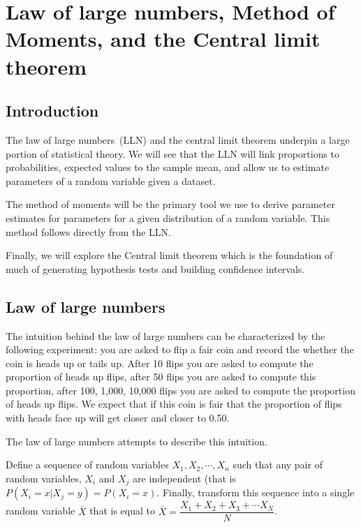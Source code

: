 \chapter{Law of large numbers, Method of Moments, and the Central limit theorem}
\hspace{1mm}

\section{Introduction}\label{intro}

The law of large numbers~(LLN) and the central limit theorem underpin a large portion of statistical theory. 
We will see that the LLN will link proportions to probabilities, expected values to the sample mean, and allow us to estimate parameters of a random variable given a dataset.

The method of moments will be the primary tool we use to derive parameter estimates for parameters for a given distribution of a random variable. This method follows directly from the LLN.

Finally, we will explore the Central limit theorem which is the foundation of much of  generating hypothesis tests and building confidence intervals. 

\section{Law of large numbers}\label{intro}

The intuition behind the law of large numbers can be characterized by the following experiment: you are asked to flip a fair coin and record the whether the coin is heads up or tails up. After 10 flips you are asked to compute the proportion of heads up flips, after 50 flips you are asked to compute this proportion, after 100, 1,000, 10,000 flips you are asked to compute the proportion of heads up flips. We expect that if this coin is fair that the proportion of flips with heads face up will get closer and closer to 0.50. 

The law of large numbers attempts to describe this intuition.

Define a sequence of random variables $X_{1}, X_{2}, \cdots, X_{n}$ such that any pair of random variables, $X_{i}$ and $X_{j}$ are independent (that is $P(X_{i} = x | X_{j} = y) =P(X_{i} = x)$. Finally, transform this sequence into a single random variable $\overline{X}$ that is equal to $\overline{X} = \dfrac{X_{1} + X_{2} + X_{3} + \cdots X_{N}}{N}$. 

